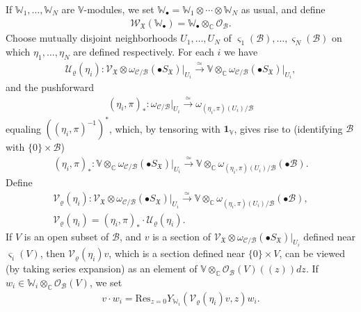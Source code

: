\documentclass[12pt,a4paper,notitlepage]{report}
\theoremstyle{definition}
\theoremstyle{plain}
\newcommand{\fk}{\mathfrak}
\newcommand{\mc}{\mathcal}
\newcommand{\id}{\mathbf{1}}
\newcommand{\Res}{\mathrm{Res}}
\newcommand{\scr}{\mathscr}
\newcommand{\sgm}{\varsigma}
\newcommand{\blt}{\bullet}
\newcommand{\Vbb}{\mathbb V}
\newcommand{\Wbb}{\mathbb W}
\newcommand{\Cbb}{\mathbb C}
\numberwithin{equation}{section}
\begin{document}
If $\Wbb_1,\dots,\Wbb_N$ are $\Vbb$-modules, we set $\Wbb_\blt=\Wbb_1\otimes \cdots\otimes \Wbb_N$ as usual, and define
\begin{align}
\scr W_{\fk X}(\Wbb_\blt)=\Wbb_\blt\otimes_{\Cbb}\scr O_{\mc B}.
\end{align}
Choose mutually disjoint neighborhoods $U_1,\dots,U_N$ of $\sgm_1(\mc B),\dots,\sgm_N(\mc B)$ on which $\eta_1,\dots,\eta_N$ are defined respectively. For each $i$ we have
\begin{gather*}
\mc U_\varrho(\eta_i):\scr V_{\fk X}\otimes\omega_{\mc C/\mc B}(\blt S_{\fk X})\big|_{U_i}\xrightarrow{\simeq}\Vbb\otimes_{\Cbb}\omega_{\mc C/\mc B}(\blt S_{\fk X})\big|_{U_i},
\end{gather*}
and the  pushforward
\begin{gather*}
(\eta_i,\pi)_*:\omega_{\mc C/\mc B}\big|_{U_i}\xrightarrow{\simeq}\omega_{(\eta_i,\pi)(U_i)/\mc B}
\end{gather*}
equaling $((\eta_i,\pi)^{-1})^*$, which, by tensoring with $\id_\Vbb$, gives rise to (identifying $\mc B$ with $\{0\}\times\mc B$)
\begin{gather*}
(\eta_i,\pi)_*:\Vbb\otimes_{\Cbb}\omega_{\mc C/\mc B}(\blt S_{\fk X})\big|_{U_i}\xrightarrow{\simeq}\Vbb\otimes_{\Cbb}\omega_{(\eta_i,\pi)(U_i)/\mc B}(\blt \mc B).
\end{gather*}
Define \index{UV@$\mc U_\varrho(\eta),\mc U_\varrho(\varphi),\mc V_\varrho(\eta),\mc V_\varrho(\varphi)$}
\begin{gather}
\mc V_\varrho(\eta_i):\scr V_{\fk X}\otimes\omega_{\mc C/\mc B}(\blt S_{\fk X})\big|_{U_i}\xrightarrow{\simeq}\Vbb\otimes_{\Cbb}\omega_{(\eta_i,\pi)(U_i)/\mc B}(\blt \mc B),\nonumber\\
\mc V_{\varrho}(\eta_i)=(\eta_i,\pi)_*\cdot \mc U_{\varrho}(\eta_i).
\end{gather}
If $V$ is an open subset of $\mc B$, and $v$ is a section of $\scr V_{\fk X}\otimes\omega_{\mc C/\mc B}(\blt S_{\fk X})\big|_{U_i}$ defined near $\sgm_i(V)$, then $\mc V_\varrho(\eta_i)v$, which is a section defined near $\{0\}\times V$, can be viewed (by taking series expansion) as an element of $\Vbb\otimes_\Cbb\scr O_{\mc B}(V)((z))dz$. If $w_i\in\Wbb_i\otimes_\Cbb\scr O_{\mc B}(V)$, we set \index{vw@$v\cdot w_i,v\cdot w_\blt$}
\begin{align}
v\cdot w_i=\Res_{z=0}Y_{\Wbb_i}(\mc V_\varrho(\eta_i)v,z)w_i.\label{eq116}
\end{align}
\end{document}

